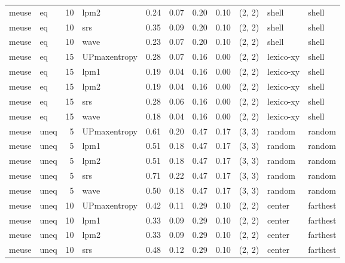 \begin{tabular}{llrlrrrrlll}
 meuse &    eq & 10 &         lpm2 &  0.24 &     0.07 &   0.20 &       0.10 & (2, 2) &       shell &      shell \\
 meuse &    eq & 10 &          srs &  0.35 &     0.09 &   0.20 &       0.10 & (2, 2) &       shell &      shell \\
 meuse &    eq & 10 &         wave &  0.23 &     0.07 &   0.20 &       0.10 & (2, 2) &       shell &      shell \\
 meuse &    eq & 15 & UPmaxentropy &  0.28 &     0.07 &   0.16 &       0.00 & (2, 2) &   lexico-xy &      shell \\
 meuse &    eq & 15 &         lpm1 &  0.19 &     0.04 &   0.16 &       0.00 & (2, 2) &   lexico-xy &      shell \\
 meuse &    eq & 15 &         lpm2 &  0.19 &     0.04 &   0.16 &       0.00 & (2, 2) &   lexico-xy &      shell \\
 meuse &    eq & 15 &          srs &  0.28 &     0.06 &   0.16 &       0.00 & (2, 2) &   lexico-xy &      shell \\
 meuse &    eq & 15 &         wave &  0.18 &     0.04 &   0.16 &       0.00 & (2, 2) &   lexico-xy &      shell \\
 meuse &  uneq &  5 & UPmaxentropy &  0.61 &     0.20 &   0.47 &       0.17 & (3, 3) &      random &     random \\
 meuse &  uneq &  5 &         lpm1 &  0.51 &     0.18 &   0.47 &       0.17 & (3, 3) &      random &     random \\
 meuse &  uneq &  5 &         lpm2 &  0.51 &     0.18 &   0.47 &       0.17 & (3, 3) &      random &     random \\
 meuse &  uneq &  5 &          srs &  0.71 &     0.22 &   0.47 &       0.17 & (3, 3) &      random &     random \\
 meuse &  uneq &  5 &         wave &  0.50 &     0.18 &   0.47 &       0.17 & (3, 3) &      random &     random \\
 meuse &  uneq & 10 & UPmaxentropy &  0.42 &     0.11 &   0.29 &       0.10 & (2, 2) &      center &   farthest \\
 meuse &  uneq & 10 &         lpm1 &  0.33 &     0.09 &   0.29 &       0.10 & (2, 2) &      center &   farthest \\
 meuse &  uneq & 10 &         lpm2 &  0.33 &     0.09 &   0.29 &       0.10 & (2, 2) &      center &   farthest \\
 meuse &  uneq & 10 &          srs &  0.48 &     0.12 &   0.29 &       0.10 & (2, 2) &      center &   farthest \\

\end{tabular}

